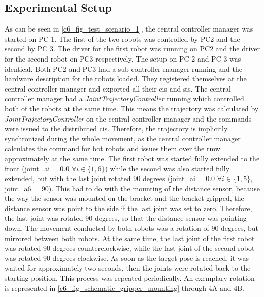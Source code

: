 \subsection{Experimental Setup}
As can be seen in \autoref{c6_fig_test_scenario_1}, the central controller manager was started on PC 1. The first of the two robots was controlled by PC2 and the second by PC 3. The driver for the first robot was running on PC2 and the driver for the second robot on PC3 respectively. The setup on PC 2 and PC 3 was identical. Both PC2 and PC3 had a sub-controller manager running and the hardware description for the robots loaded. They registered themselves at the central controller manager and exported all their \glspl{ci} and \glspl{si}. The central controller manager had a \textit{JointTrajectoryController} running which controlled both of the robots at the same time. This means the trajectory was calculated by \textit{JointTrajectoryController} on the central controller manager and the commands were issued to the distributed \glspl{ci}. Therefore, the trajectory is implicitly synchronized during the whole movement, as the central controller manager calculates the command for bot robots and issues them over the \gls{rmw} approximately at the same time.\newline
The first robot was started fully extended to the front (joint\_ai = 0.0 $\forall i\in\{1,6\}$) while the second was also started fully extended, but with the last joint rotated 90 degrees (joint\_ai = 0.0 $\forall i\in\{1,5\}$, joint\_a6 = 90). This had to do with the mounting of the distance sensor, because the way the sensor was mounted on the bracket and the bracket gripped, the distance sensor was point to the side if the last joint was set to zero. Therefore, the last joint was rotated 90 degrees, so that the distance sensor was pointing down.\newline
The movement conducted by both robots was a rotation of 90 degrees, but mirrored between both robots. At the same time, the last joint of the first robot was rotated 90 degrees counterclockwise, while the last joint of the second robot was rotated 90 degrees clockwise. As soon as the target pose is reached, it was waited for approximately two seconds, then the joints were rotated back to the starting position. This process was repeated periodically. An exemplary rotation is represented in \autoref{c6_fig_schematic_gripper_mounting} through 4A and 4B.  \newline
